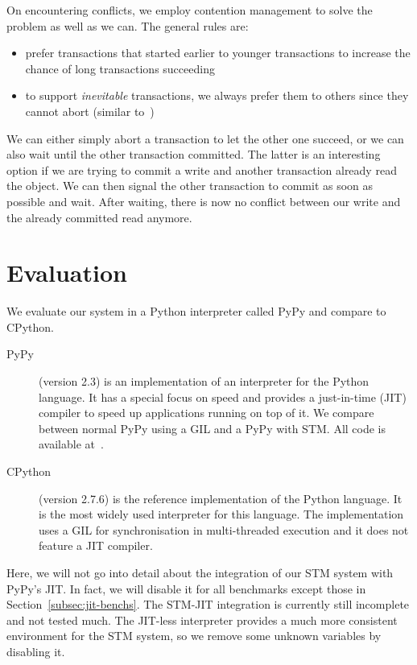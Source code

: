 \documentclass{sigplanconf}
\begin{document}
On encountering conflicts, we employ contention management to solve
the problem as well as we can. The general rules are:

\begin{itemize}
\item prefer transactions that started earlier to younger transactions
  to increase the chance of long transactions succeeding
\item to support \emph{inevitable} transactions, we always prefer them
  to others since they cannot abort (similar to~\cite{blundell06})
\end{itemize}

We can either simply abort a transaction to let the other one succeed,
or we can also wait until the other transaction committed. The latter
is an interesting option if we are trying to commit a write and
another transaction already read the object. We can then signal the
other transaction to commit as soon as possible and wait. After
waiting, there is now no conflict between our write and the already
committed read anymore.



\section{Evaluation}

We evaluate our system in a Python interpreter called
PyPy and compare to CPython.
\begin{description}
\item[PyPy] (version 2.3) is an implementation of an
  interpreter for the Python language. It has a special focus on speed
  and provides a just-in-time (JIT) compiler to speed up applications
  running on top of it. We compare between normal PyPy
  using a GIL and a PyPy with STM. All code is available at~\cite{pypy}.
\item[CPython] (version 2.7.6) is the reference implementation of the Python
  language. It is the most widely used interpreter for this language.
  The implementation uses a GIL for synchronisation in multi-threaded
  execution and it does not feature a JIT compiler.
\end{description}

Here, we will not go into detail about the integration of our STM
system with PyPy's JIT. In fact, we will disable it for all benchmarks
except those in Section~\ref{subsec:jit-benchs}. The STM-JIT
integration is currently still incomplete and not tested much. The
JIT-less interpreter provides a much more consistent environment for
the STM system, so we remove some unknown variables by disabling it.
\end{document}
